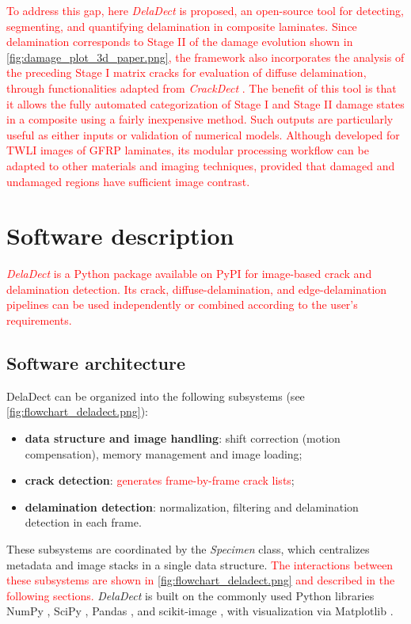 \documentclass[final,5p,times]{elsarticle}
\newcommand{\revision}[1]{\textcolor{red}{#1}}
\begin{document}
	\revision{To address this gap, here \emph{DelaDect} is proposed, an open-source tool for detecting, segmenting, and quantifying delamination in composite laminates. Since delamination corresponds to Stage II of the damage evolution shown in \autoref{fig:damage_plot_3d_paper.png}, the framework also incorporates the analysis of the preceding Stage I matrix cracks for evaluation of diffuse delamination, through functionalities adapted from \emph{CrackDect} \cite{drvodericVersion02CrackDect2022}. The benefit of this tool is that it allows the fully automated categorization of Stage I and Stage II damage states in a composite using a fairly inexpensive method. Such outputs are particularly useful as either inputs or validation of numerical models. Although developed for TWLI images of GFRP laminates, its modular processing workflow can be adapted to other materials and imaging techniques, provided that damaged and undamaged regions have sufficient image contrast.}
	
	\section{Software description}
	\label{loc:software_description}
	
	\revision{\emph{DelaDect} is a Python package available on PyPI \cite{pypi2026} for image-based crack and delamination detection. Its crack, diffuse-delamination, and edge-delamination pipelines can be used independently or combined according to the user's requirements.}
	
	
	
	
	\subsection{Software architecture}
	\label{loc:software_description.software_architecture}
	DelaDect can be organized into the following subsystems (see \autoref{fig:flowchart_deladect.png}):
	\begin{itemize}
		\item \textbf{data structure and image handling}: shift correction (motion compensation), memory management and image loading;
		\item \textbf{crack detection}: \revision{generates frame-by-frame crack lists};
		\item \textbf{delamination detection}: normalization, filtering and delamination detection in each frame.
	\end{itemize}
	
	These subsystems are coordinated by the \emph{Specimen} class, which centralizes metadata and image stacks in a single data structure. \revision{The interactions between these subsystems are shown in \autoref{fig:flowchart_deladect.png} and described in the following sections.} \emph{DelaDect} is built on the commonly used Python libraries NumPy \cite{harrisArrayProgrammingNumPy2020}, SciPy \cite{virtanenSciPy10Fundamental2020}, Pandas \cite{mckinney2010pandas},  and scikit-image \cite{van2014scikit}, with visualization via Matplotlib \cite{hunterMatplotlib2DGraphics2007}. 
	
\end{document}
